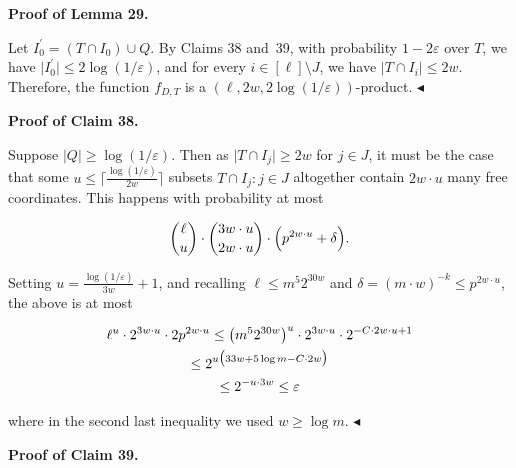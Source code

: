 \par\medskip\noindent\textbf{Proof of Lemma 29.}\par




Let $I_{0}^{\prime}=(T\cap I_{0})\cup Q$.
By Claims 38 and 39, with probability $1-2\varepsilon$ over $T$, we have $\lvert I_{0}^{\prime}\rvert\leq 2\log(1/\varepsilon)$, and for every $i\in[\ell]\setminus J$, we have $\lvert T\cap I_{i}\rvert\leq 2w$.
Therefore, the function $f_{D,T}$ is a $(\ell,2w,2\log(1/\varepsilon))$-product.
$\blacktriangleleft$\par





\par\medskip\noindent\textbf{Proof of Claim 38.}\par




Suppose $\lvert Q\rvert\geq\log(1/\varepsilon)$.
Then as $\lvert T\cap I_{j}\rvert\geq 2w$ for $j\in J$, it must be the case that some $u\leq\lceil\frac{\log(1/\varepsilon)}{2w}\rceil$ subsets $T\cap I_{j}:j\in J$ altogether contain $2w\cdot u$ many free coordinates.
This happens with probability at most\par


\[\begin{gathered}
\binom{\ell}{u}\cdot\binom{3w\cdot u}{2w\cdot u}\cdot\Bigl{(}p^{2w\cdot u}+\delta\Bigr{)}.
\end{gathered}\]


Setting $u=\frac{\log(1/\varepsilon)}{3w}+1$, and recalling $\ell\leq m^{5}2^{30w}$ and $\delta=(m\cdot w)^{-k}\leq p^{2w\cdot u}$, the above is at most\par


\[\begin{gathered}
\displaystyle\ell^{u}\cdot 2^{3w\cdot u}\cdot 2p^{2w\cdot u} \displaystyle\leq\bigl{(}m^{5}2^{30w}\bigr{)}^{u}\cdot 2^{3w\cdot u}\cdot 2^{-C\cdot 2w\cdot u+1} \\
\displaystyle\leq 2^{u\bigl{(}33w+5\log m-C\cdot 2w\bigr{)}} \\
\displaystyle\leq 2^{-u\cdot 3w}\leq\varepsilon
\end{gathered}\]


where in the second last inequality we used $w\geq\log m$.
$\blacktriangleleft$\par





\par\medskip\noindent\textbf{Proof of Claim 39.}\par




